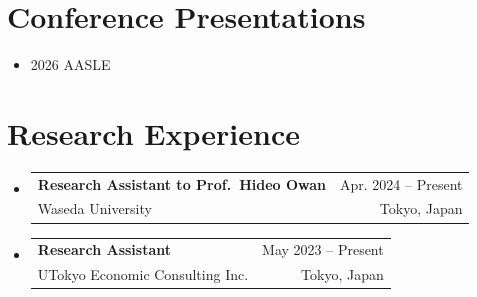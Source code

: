\documentclass[letterpaper,11pt]{article}
\makeatletter
\newcommand{\resumeItem}[1]{
  \item\small{
    {#1 \vspace{-2pt}}
  }
}
\newcommand{\resumeSubheading}[4]{
  \vspace{-2pt}\item
    \begin{tabular*}{0.97\textwidth}[t]{l@{\extracolsep{\fill}}r}
      \expandafter#1 & {\small #2} \\
      {\small#3} & {\small #4} \\
    \end{tabular*}\vspace{-7pt}
}
\newcommand{\resumeSubHeadingListStart}{\begin{itemize}[leftmargin=0.15in, label={}]}
\newcommand{\resumeSubHeadingListEnd}{\end{itemize}}
\newcommand{\resumeItemListStart}{\begin{itemize}}
\newcommand{\resumeItemListEnd}{\end{itemize}\vspace{-5pt}}
\newcommand{\resumePublication}[1]{
  \item\small{
    #1 \vspace{-2pt}
  }
}
\newcommand{\resumeConferencePresentation}[2]{
  \item\small{
    \textbf{#1}: #2 \vspace{-2pt}
  }
}
\makeatother
\begin{document}

\section{Conference Presentations}
    \resumeSubHeadingListStart
      \resumePublication{2026 AASLE}
    \resumeSubHeadingListEnd

\section{Research Experience}
    \resumeSubHeadingListStart
        \resumeSubheading
        {\textbf{Research Assistant to Prof.\ Hideo Owan}}{Apr. 2024 -- Present}
        {Waseda University}{Tokyo, Japan}
        \resumeSubheading
        {\textbf{Research Assistant}}{May 2023 -- Present}
        {UTokyo Economic Consulting Inc.}{Tokyo, Japan}
  \resumeSubHeadingListEnd

\end{document}
